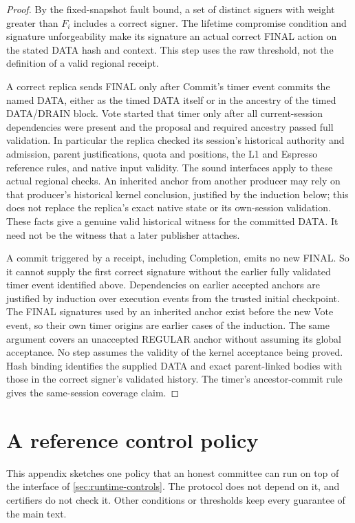 \documentclass[11pt,a4paper]{article}
\newcounter{protocol}
\begin{document}
\begin{proof}
By the fixed-snapshot fault bound, a set of distinct signers with weight
greater than $F_i$ includes a correct signer. The lifetime compromise
condition and signature unforgeability make its signature an actual
correct FINAL action on the stated DATA hash and context. This step uses
the raw threshold, not the definition of a valid regional receipt.

A correct replica sends FINAL only after Commit's timer event commits the
named DATA, either as the timed DATA itself or in the ancestry of the
timed DATA/DRAIN block. Vote started that timer only after all
current-session dependencies were present and the proposal and required
ancestry passed full validation. In particular the replica checked its
session's historical authority and admission, parent justifications,
quota and positions, the L1 and Espresso reference rules, and native
input validity. The sound interfaces apply to these actual regional
checks. An inherited anchor from another producer may rely on that
producer's historical kernel conclusion, justified by the induction
below; this does not replace the replica's exact native state or its
own-session validation. These facts give a genuine valid historical
witness for the committed DATA. It need not be the witness that a later
publisher attaches.

A commit triggered by a receipt, including Completion, emits no new
FINAL. So it cannot supply the first correct signature without the
earlier fully validated timer event identified above. Dependencies on
earlier accepted anchors are justified by induction over execution
events from the trusted initial checkpoint. The FINAL signatures used by
an inherited anchor exist before the new Vote event, so their own timer
origins are earlier cases of the induction. The same argument covers an
unaccepted REGULAR anchor without assuming its global acceptance. No step
assumes the validity of the kernel acceptance being proved. Hash binding
identifies the supplied DATA and exact parent-linked bodies with those in
the correct signer's validated history. The timer's ancestor-commit rule
gives the same-session coverage claim.
\end{proof}

\section{A reference control policy}
\label{app:policy}
This appendix sketches one policy that an honest committee can run on
top of the interface of \cref{sec:runtime-controls}. The protocol does
not depend on it, and certifiers do not check it. Other conditions or
thresholds keep every guarantee of the main text.
\end{document}
